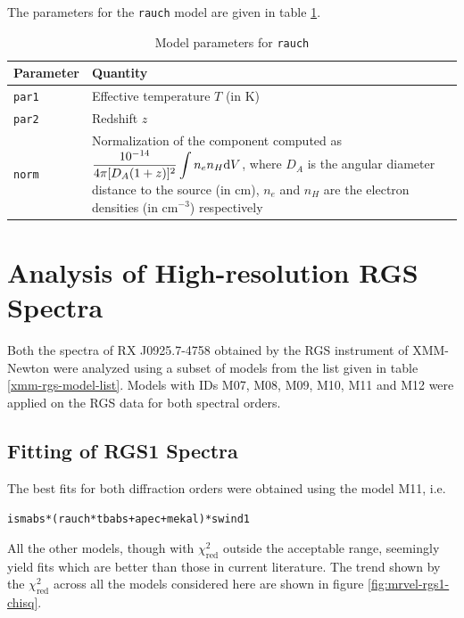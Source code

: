				The parameters for the \texttt{rauch} model are given in table \ref{param:rauch}.
				\begin{table}[h!]
					\centering
					\caption{Model parameters for \texttt{rauch}}
					\label{param:rauch}
					\begin{tabular}{p{}p{}}
						\hline
						\textbf{Parameter} & \textbf{Quantity} \\ \hline
						{\texttt{par1}} & {Effective temperature $T$ (in K)} \\ %
						{\texttt{par2}} & {Redshift $z$} \\ %
						{\texttt{norm}} & {Normalization of the component computed as $\displaystyle\dfrac{10^{-14}}{4\pi[D_A(1+z)]^2}\int{n_en_H\mathrm{d}V}$, where $D_A$ is the angular diameter distance to the source (in cm), $n_e$ and $n_H$ are the electron densities (in cm$^{-3}$) respectively} \\ \hline
					\end{tabular}
				\end{table}
	
	\section{Analysis of High-resolution RGS Spectra} \label{hi-resolution:analysis}
		Both the spectra of RX J0925.7-4758 obtained by the RGS instrument of XMM-Newton were analyzed using a subset of models from the list given in table \ref{xmm-rgs-model-list}. Models with IDs M07, M08, M09, M10, M11 and M12 were applied on the RGS data for both spectral orders.
		
		\subsection{Fitting of RGS1 Spectra} \label{hi-resolution:analysis:rgs1}
			The best fits for both diffraction orders were obtained using the model M11, i.e.
			\begin{center}
				\texttt{ismabs*(rauch*tbabs+apec+mekal)*swind1}
			\end{center}
			All the other models, though with $\chi^2_\text{red}$ outside the acceptable range, seemingly yield fits which are better than those in current literature. The trend shown by the $\chi^2_\text{red}$ across all the models considered here are shown in figure \ref{fig:mrvel-rgs1-chisq}.
			
